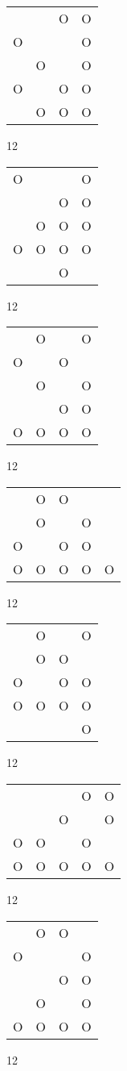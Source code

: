 \begin{tabular}{|m{0.2cm}m{0.2cm}m{0.2cm}m{0.2cm}|}\hline
 & &O&O\\
O& & &O\\
 &O& &O\\
O& &O&O\\
 &O&O&O\\
\hline\end{tabular}12
\begin{tabular}{|m{0.2cm}m{0.2cm}m{0.2cm}m{0.2cm}|}\hline
O& & &O\\
 & &O&O\\
 &O&O&O\\
O&O&O&O\\
 & &O& \\
\hline\end{tabular}12
\begin{tabular}{|m{0.2cm}m{0.2cm}m{0.2cm}m{0.2cm}|}\hline
 &O& &O\\
O& &O& \\
 &O& &O\\
 & &O&O\\
O&O&O&O\\
\hline\end{tabular}12
\begin{tabular}{|m{0.2cm}m{0.2cm}m{0.2cm}m{0.2cm}m{0.2cm}|}\hline
 &O&O& & \\
 &O& &O& \\
O& &O&O& \\
O&O&O&O&O\\
\hline\end{tabular}12
\begin{tabular}{|m{0.2cm}m{0.2cm}m{0.2cm}m{0.2cm}|}\hline
 &O& &O\\
 &O&O& \\
O& &O&O\\
O&O&O&O\\
 & & &O\\
\hline\end{tabular}12
\begin{tabular}{|m{0.2cm}m{0.2cm}m{0.2cm}m{0.2cm}m{0.2cm}|}\hline
 & & &O&O\\
 & &O& &O\\
O&O& &O& \\
O&O&O&O&O\\
\hline\end{tabular}12
\begin{tabular}{|m{0.2cm}m{0.2cm}m{0.2cm}m{0.2cm}|}\hline
 &O&O& \\
O& & &O\\
 & &O&O\\
 &O& &O\\
O&O&O&O\\
\hline\end{tabular}12
